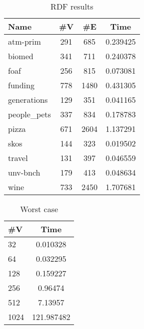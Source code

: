 \begin{minipage}[t]{52mm}
{\setlength{\tabcolsep}{0.4em}
\begin{table}[H]
\centering
\caption{RDF results}
\label{tbl:tableRDF}
\begin{tabular}{| p{1.6cm} | c | c | c |}
    \hline
    Name                                & \#V & \#E     & Time \\
    \hline
    \hline
    \small{atm-prim}                    & 291 & 685     & 0.239425 \\
    \small{biomed}                      & 341 & 711     & 0.240378 \\
    \small{foaf}                        & 256 & 815     & 0.073081 \\
    \small{funding}                     & 778 & 1480    & 0.431305 \\
    \small{generations}                 & 129 & 351     & 0.041165 \\
    \small{people\_pets}                & 337 & 834     & 0.178783 \\
    \small{pizza}                       & 671 & 2604    & 1.137291 \\
    \small{skos}                        & 144 & 323     & 0.019502 \\
    \small{travel}                      & 131 & 397     & 0.046559 \\
    \small{unv-bnch}                    & 179 & 413     & 0.048634 \\
    \small{wine}                        & 733 & 2450    & 1.707681 \\
    \hline
  \end{tabular}
\end{table}
}

\end{minipage}
\hfill
\begin{minipage}[t]{27mm}

{
\begin{table}[H]
\centering
\caption{Worst case}
\label{tbl:tableWorst}
\begin{tabular}{| l | | c |}
    \hline
    \#V  & Time       \\
    \hline
    \hline
    
    32   & 0.010328   \\
    64   & 0.032295   \\
    128  & 0.159227   \\
    256  & 0.96474    \\
    512  & 7.13957    \\
    1024 & 121.987482 \\
    \hline
  \end{tabular}
\end{table}
}

\end{minipage}
